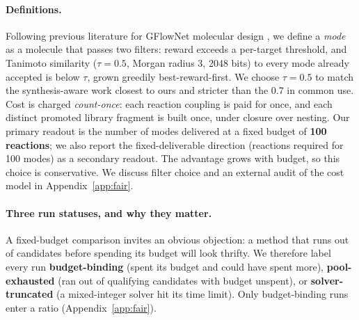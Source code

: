 \documentclass{article}
\newcommand{\checkval}[1]{\textcolor{blue}{#1}}
\begin{document}
\paragraph{Definitions.}
Following previous literature for GFlowNet molecular design
\citep{bengio2021flow,zhang2023quantileflows,lau2024qgfn,shen2025cgflow}, we define a \emph{mode} as a molecule that passes two filters: reward exceeds a per-target threshold, and Tanimoto similarity ($\tau = 0.5$, Morgan radius 3, 2048 bits) to every mode already accepted is below $\tau$, grown greedily best-reward-first. We choose $\tau = 0.5$ to match the synthesis-aware work closest to ours \citep{shen2025cgflow} and stricter than the 0.7 in common use. Cost is charged \emph{count-once}: each reaction coupling is paid for once, and each distinct promoted library fragment is built once, under closure over nesting. Our primary readout is the number of modes delivered at a fixed budget of \textbf{100 reactions}; we also report the fixed-deliverable direction (reactions required for 100 modes) as a secondary readout. The advantage grows with budget, so this choice is conservative. We discuss filter choice and an external audit of the cost model in Appendix~\ref{app:fair}.

\paragraph{Three run statuses, and why they matter.}
A fixed-budget comparison invites an obvious objection: a method that runs out of candidates before spending its budget will look thrifty. We therefore label every run \textbf{budget-binding} (spent its budget and could have spent more), \textbf{pool-exhausted} (ran out of qualifying candidates with budget unspent), or \textbf{solver-truncated} (a mixed-integer solver hit its time limit). Only budget-binding runs enter a ratio (Appendix~\ref{app:fair}).

\end{document}
